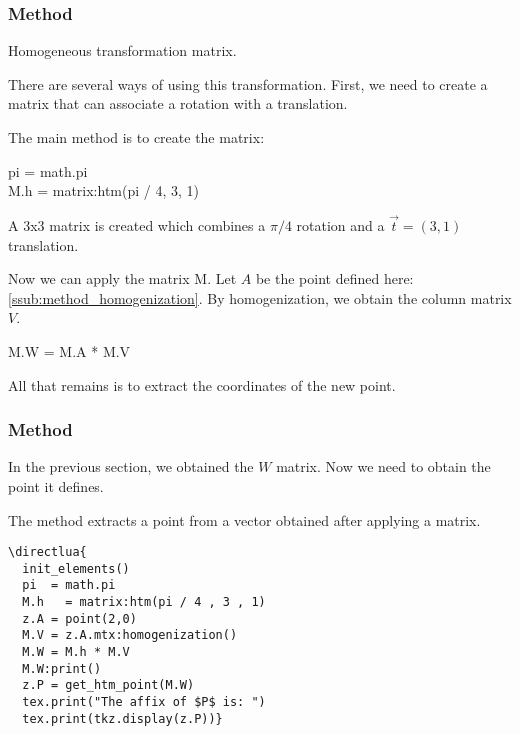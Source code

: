 \subsubsection{Method }
\label{ssub:method_htm}
Homogeneous transformation matrix.

There are several ways of using this transformation. First, we need to create a matrix that can associate a rotation with a translation.

The main method is to create the matrix:

\begin{mybox}
  pi  = math.pi\\
  M.h   = matrix:htm(pi / 4, 3, 1)
\end{mybox}

A 3x3 matrix is created which combines a $\pi/4$ rotation and a $\overrightarrow{t}=(3,1)$ translation.



Now we can apply the matrix M. Let $A$ be the point defined here: \ref{ssub:method_homogenization}. By homogenization, we obtain the column matrix $V$.


\begin{mybox}
M.W = M.A * M.V
\end{mybox}


All that remains is to extract the coordinates of the new point.

\subsubsection{Method }
\label{ssub:method_get_htm_point}

In the previous section, we obtained the $W$ matrix. Now we need to obtain the point it defines.

The  method   extracts a point from a vector obtained after applying a  matrix.

\begin{minipage}{.5\textwidth}
\begin{verbatim}
\directlua{
  init_elements()
  pi  = math.pi
  M.h   = matrix:htm(pi / 4 , 3 , 1)
  z.A = point(2,0)
  M.V = z.A.mtx:homogenization()
  M.W = M.h * M.V
  M.W:print()
  z.P = get_htm_point(M.W)
  tex.print("The affix of $P$ is: ")
  tex.print(tkz.display(z.P))}
\end{verbatim}
\end{minipage}
\begin{minipage}{.5\textwidth}
\end{minipage}

